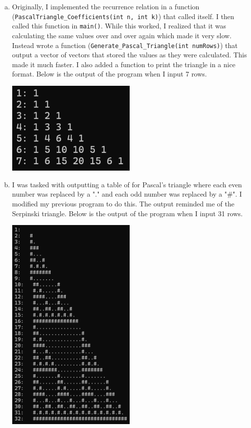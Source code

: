 \documentclass{article}
\begin{document}
\begin{enumerate}[a)]
    \item Originally, I implemented the recurrence relation in a function (\verb|PascalTriangle_Coefficients(int n, int k)|) that called itself. I then called this function in \verb|main()|. While this worked, I realized that it was calculating the same values over and over again which made it very slow. Instead wrote a function (\verb|Generate_Pascal_Triangle(int numRows)|) that output a vector of vectors that stored the values as they were calculated. This made it much faster. I also added a function to print the triangle in a nice format. Below is the output of the program when I input 7 rows. \\ 
    \begin{center}
        \includegraphics[width=0.5\textwidth]{OpHw1_1a.png}
    \end{center}
    \newpage
    \item I was tasked with outputting a table of for Pascal's triangle where each even number was replaced by a "." and each odd number was replaced by a "\#". I modified my previous program to do this. The output reminded me of the Serpinski triangle. Below is the output of the program when I input 31 rows. \\
    \begin{center}
        \includegraphics[width=0.5\textwidth]{OpHw1_1b.png}
    \end{center}
\end{enumerate}
\end{document}
